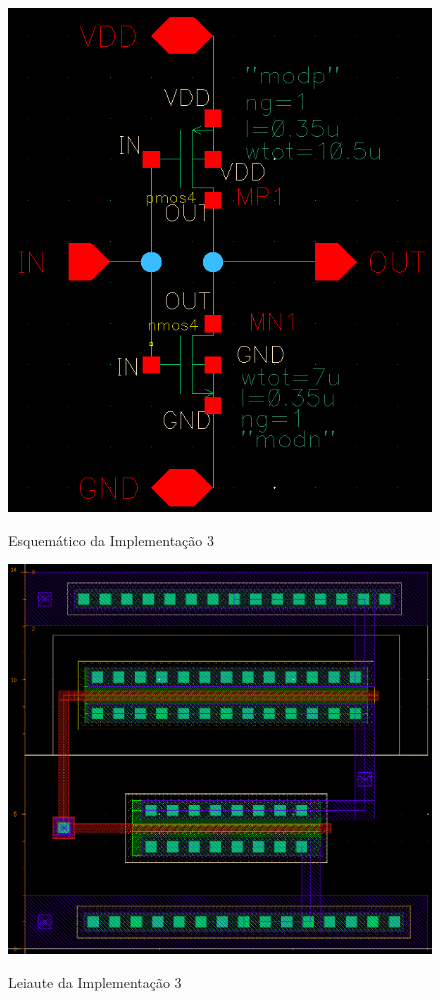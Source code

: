 \documentclass{iiufrgs}
\begin{document}
\begin{figure}[htbp]
    \centering
    \caption{Esquemático da Implementação 3}
    \includegraphics[scale=0.8]{images/esquematico3.png}
    \label{fig:esquematico3}
\end{figure}

\begin{figure}[htbp]
    \centering
    \caption{Leiaute da Implementação 3}
    \includegraphics[scale=0.7]{images/layout3.png}
    \label{fig:leiaute3}
\end{figure}
\end{document}
